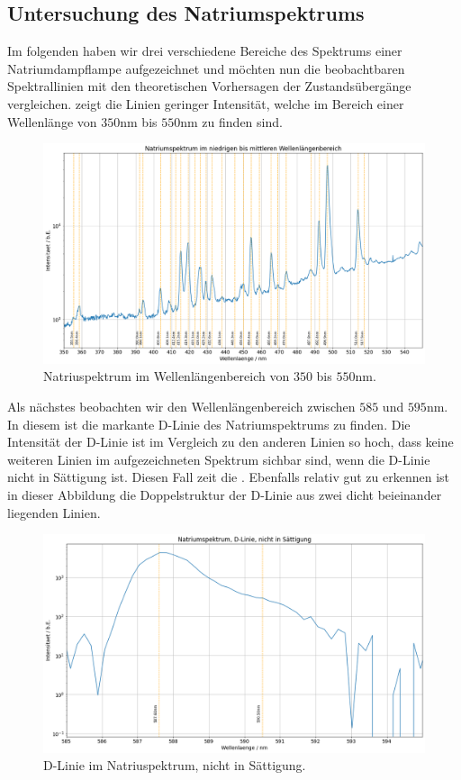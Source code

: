 \subsection{Untersuchung des Natriumspektrums}

Im folgenden haben wir drei verschiedene Bereiche des Spektrums einer Natriumdampflampe aufgezeichnet und möchten nun die beobachtbaren Spektrallinien mit den theoretischen Vorhersagen der Zustandsübergänge vergleichen.  zeigt die Linien geringer Intensität, welche im Bereich einer Wellenlänge von $350\si{\nano\meter}$ bis $550\si{\nano\meter}$ zu finden sind. 


\begin{figure}[H]
  \centering
  \includegraphics[width=.9\textwidth]{files/plots/na_spek_350_550.png}
  \caption{Natriuspektrum im Wellenlängenbereich von $350$ bis $550\si{\nano\meter}$.}
  \label{fig:na_spek_350_550}
\end{figure}

Als nächstes beobachten wir den Wellenlängenbereich zwischen $585$ und $595\si{\nano\meter}$. In diesem ist die markante D-Linie des Natriumspektrums zu finden. Die Intensität der D-Linie ist im Vergleich zu den anderen Linien so hoch, dass keine weiteren Linien im aufgezeichneten Spektrum sichbar sind, wenn die D-Linie nicht in Sättigung ist. Diesen Fall zeit die . Ebenfalls relativ gut zu erkennen ist in dieser Abbildung die Doppelstruktur der D-Linie aus zwei dicht beieinander liegenden Linien.


\begin{figure}[H]
  \centering
  \includegraphics[width=.9\textwidth]{files/plots/na_spek_dlinie_nichtsaett.png}
  \caption{D-Linie im Natriuspektrum, nicht in Sättigung.}
  \label{fig:na_spek_dlinie_nichtsaett}
\end{figure}

